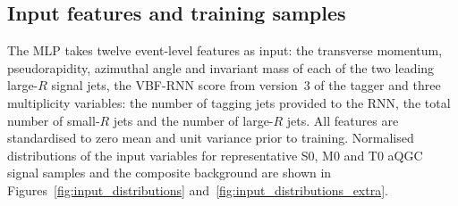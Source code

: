 \subsection{Input features and training samples}

The MLP takes twelve event-level features as input: the transverse momentum, pseudorapidity, azimuthal angle and invariant mass of each of the two leading large-$R$ signal jets, the VBF-RNN score from version~3 of the tagger and three multiplicity variables: the number of tagging jets provided to the RNN, the total number of small-$R$ jets and the number of large-$R$ jets. All features are standardised to zero mean and unit variance prior to training. Normalised distributions of the input variables for representative S0, M0 and T0 aQGC signal samples and the composite background are shown in Figures~\ref{fig:input_distributions} and~\ref{fig:input_distributions_extra}.

